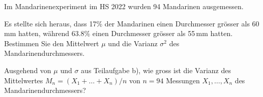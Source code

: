 Im Mandarinenexperiment im HS 2022 wurden 94 Mandarinen ausgemessen.
\begin{teilaufgaben}
\item
Es stellte sich heraus, dass 17\% der Mandarinen einen Durchmesser
grösser als 60\,mm hatten, während 63.8\% einen Durchmesser 
grösser als 55\,mm hatten.
Bestimmen Sie den Mittelwert $\mu$ und die Varianz $\sigma^2$
des Mandarinendurchmessers.
\item
Ausgehend von $\mu$ und $\sigma$ aus Teilaufgabe b),
wie gross ist die Varianz des Mittelwertes $M_n = (X_1+\dots+X_n)/n$
von $n=94$ Messungen $X_1,\dots,X_n$ des Mandarinendurchmessers?
\end{teilaufgaben}

